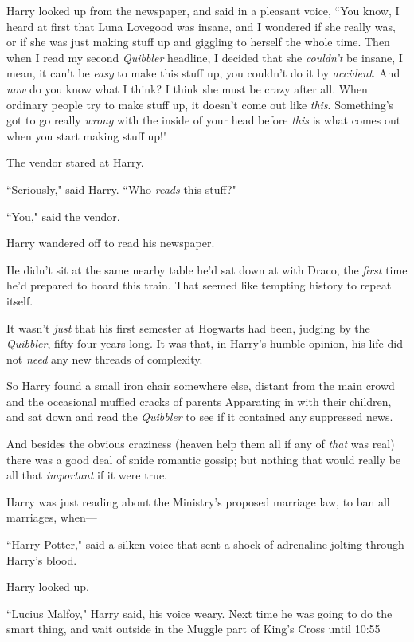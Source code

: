 Harry looked up from the newspaper, and said in a pleasant voice, ``You know, I heard at first that Luna Lovegood was insane, and I wondered if she really was, or if she was just making stuff up and giggling to herself the whole time. Then when I read my second \emph{Quibbler} headline, I decided that she \emph{couldn't} be insane, I mean, it can't be \emph{easy} to make this stuff up, you couldn't do it by \emph{accident}. And \emph{now} do you know what I think? I think she must be crazy after all. When ordinary people try to make stuff up, it doesn't come out like \emph{this}. Something's got to go really \emph{wrong} with the inside of your head before \emph{this} is what comes out when you start making stuff up!"

The vendor stared at Harry.

``Seriously," said Harry. ``Who \emph{reads} this stuff?"

``You," said the vendor.

Harry wandered off to read his newspaper.

He didn't sit at the same nearby table he'd sat down at with Draco, the \emph{first} time he'd prepared to board this train. That seemed like tempting history to repeat itself.

It wasn't \emph{just} that his first semester at Hogwarts had been, judging by the \emph{Quibbler}, fifty-four years long. It was that, in Harry's humble opinion, his life did not \emph{need} any new threads of complexity.

So Harry found a small iron chair somewhere else, distant from the main crowd and the occasional muffled cracks of parents Apparating in with their children, and sat down and read the \emph{Quibbler} to see if it contained any suppressed news.

And besides the obvious craziness (heaven help them all if any of \emph{that} was real) there was a good deal of snide romantic gossip; but nothing that would really be all that \emph{important} if it were true.

Harry was just reading about the Ministry's proposed marriage law, to ban all marriages, when---

``Harry Potter," said a silken voice that sent a shock of adrenaline jolting through Harry's blood.

Harry looked up.

``Lucius Malfoy," Harry said, his voice weary. Next time he was going to do the smart thing, and wait outside in the Muggle part of King's Cross until 10:55\am

